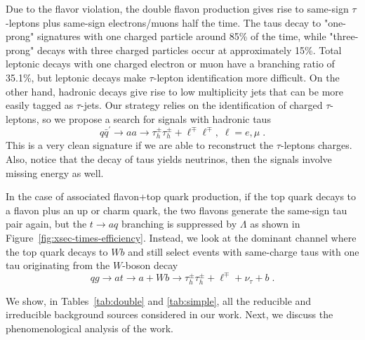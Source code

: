 \documentclass[prd,amsfonts,onecolumn,superscriptaddress,aps,nofootinbib,11pt]{revtex4-1}
\begin{document}
Due to the flavor violation, the double flavon production gives rise to same-sign $\tau$-leptons plus same-sign electrons/muons half the time. The taus decay to "one-prong" signatures with one charged particle around 85\% of the time, while "three-prong" decays with three charged particles occur at approximately 15\%. Total leptonic decays with one charged electron or muon have a branching ratio of 35.1\%, but leptonic decays make $\tau$-lepton identification more difficult. On the other hand, hadronic decays give rise to low multiplicity jets that can be more easily tagged as $\tau$-jets. Our strategy relies on the identification of charged $\tau$-leptons, so we propose a search for signals with hadronic taus 
\begin{equation}
q\bar{q}^\prime\to aa\to \tau_h^\pm\tau_h^\pm+\ell^\mp \ell^\mp,\; \ell=e,\mu\; .
\end{equation}
This is a very clean signature if we are able to reconstruct the $\tau$-leptons charges. Also, notice that the decay of taus yields neutrinos, then the signals involve missing energy as well.%

In the case of associated flavon+top quark production,  if the top quark decays to a flavon plus an up or charm quark, the two flavons generate the same-sign tau pair again, but the $t\to aq$ branching is suppressed by $\Lambda$ as shown in Figure~\ref{fig:xsec-times-efficiency}. Instead, we look at the dominant channel where the top quark decays to $Wb$ and still select events with same-charge taus with one tau originating from the $W$-boson decay
\begin{equation}
    qg \to a t \to a+W b\to \tau_h^{\pm} \tau_h^{\pm} + \ell^{\mp} + \nu_\tau + b \;.
\end{equation}

We show, in Tables~\eqref{tab:double} and \eqref{tab:simple}, all the reducible and irreducible background sources considered in our work. Next, we discuss the phenomenological analysis of the work.

\end{document}
